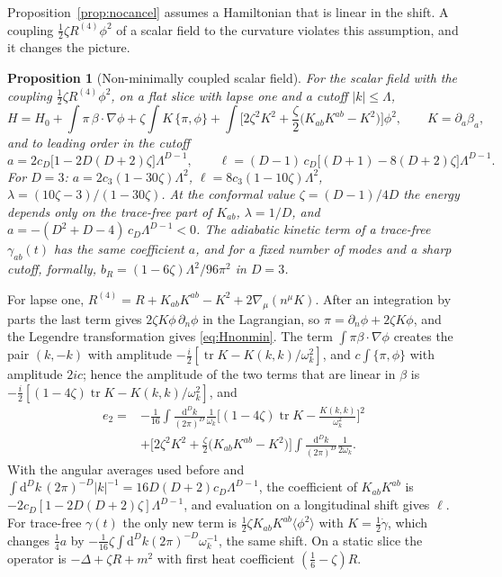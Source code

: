 \documentclass[11pt,a4paper]{article}
\makeatletter
\theoremstyle{stmt}
\newtheorem{proposition}[theorem]{Proposition}
\theoremstyle{defn}
\theoremstyle{rmk}
\renewenvironment{proof}[1][\proofname]{\par\pushQED{\qed}\normalfont\topsep6\p@\@plus6\p@\relax
  \trivlist\item[\hskip\labelsep{\sffamily\itshape\small #1.}]\ignorespaces}{\popQED\endtrivlist\@endpefalse}
\numberwithin{equation}{section}
\newcommand{\dd}{\mathrm{d}}
\makeatother
\begin{document}
Proposition~\ref{prop:nocancel} assumes a Hamiltonian that is linear in the shift. A coupling $\tfrac12\zeta R^{(4)}\phi^2$ of a scalar field to the curvature violates this assumption, and it changes the picture.

\begin{proposition}[Non-minimally coupled scalar field]\label{prop:nonmin}
For the scalar field with the coupling $\tfrac12\zeta R^{(4)}\phi^2$, on a flat slice with lapse one and a cutoff $|k|\le\Lambda$,
\begin{equation}\label{eq:Hnonmin}
H=H_0+\int\pi\,\beta\!\cdot\!\nabla\phi+\zeta\int K\,\{\pi,\phi\}+\int\Big[2\zeta^2K^2+\frac\zeta2\big(K_{ab}K^{ab}-K^2\big)\Big]\phi^2,\qquad K=\partial_a\beta_a ,
\end{equation}
and to leading order in the cutoff
\begin{equation}\label{eq:alnonmin}
a=2c_D\big[1-2D(D+2)\zeta\big]\Lambda^{D-1},\qquad\ell=(D-1)\,c_D\big[(D+1)-8(D+2)\zeta\big]\Lambda^{D-1}.
\end{equation}
For $D=3$: $a=2c_3(1-30\zeta)\Lambda^2$, $\ell=8c_3(1-10\zeta)\Lambda^2$, $\lambda=(10\zeta-3)/(1-30\zeta)$. At the conformal value $\zeta=(D-1)/4D$ the energy depends only on the trace-free part of $K_{ab}$, $\lambda=1/D$, and $a=-(D^2+D-4)\,c_D\Lambda^{D-1}<0$. The adiabatic kinetic term of a trace-free $\gamma_{ab}(t)$ has the same coefficient $a$, and for a fixed number of modes and a sharp cutoff, formally, $b_R=(1-6\zeta)\Lambda^2/96\pi^2$ in $D=3$.
\end{proposition}

\begin{proof}
For lapse one, $R^{(4)}=R+K_{ab}K^{ab}-K^2+2\nabla_\mu(n^\mu K)$. After an integration by parts the last term gives $2\zeta K\phi\,\partial_n\phi$ in the Lagrangian, so $\pi=\partial_n\phi+2\zeta K\phi$, and the Legendre transformation gives \eqref{eq:Hnonmin}. The term $\int\pi\beta\cdot\nabla\phi$ creates the pair $(k,-k)$ with amplitude $-\tfrac i2[\operatorname{tr}K-K(k,k)/\omega_k^2]$, and $c\int\{\pi,\phi\}$ with amplitude $2ic$; hence the amplitude of the two terms that are linear in $\beta$ is $-\tfrac i2[(1-4\zeta)\operatorname{tr}K-K(k,k)/\omega_k^2]$, and
\begin{align*}
e_2={}&-\frac1{16}\int\frac{\dd^Dk}{(2\pi)^D}\frac1{\omega_k}\Big[(1-4\zeta)\operatorname{tr}K-\frac{K(k,k)}{\omega_k^2}\Big]^2\\
&+\Big[2\zeta^2K^2+\frac\zeta2\big(K_{ab}K^{ab}-K^2\big)\Big]\int\frac{\dd^Dk}{(2\pi)^D}\frac1{2\omega_k}.
\end{align*}
With the angular averages used before and $\int\dd^Dk\,(2\pi)^{-D}|k|^{-1}=16D(D+2)c_D\Lambda^{D-1}$, the coefficient of $K_{ab}K^{ab}$ is $-2c_D[1-2D(D+2)\zeta]\Lambda^{D-1}$, and evaluation on a longitudinal shift gives $\ell$. For trace-free $\gamma(t)$ the only new term is $\tfrac12\zeta K_{ab}K^{ab}\langle\phi^2\rangle$ with $K=\tfrac12\dot\gamma$, which changes $\tfrac14a$ by $-\tfrac1{16}\zeta\int\dd^Dk(2\pi)^{-D}\omega_k^{-1}$, the same shift. On a static slice the operator is $-\Delta+\zeta R+m^2$ with first heat coefficient $(\tfrac16-\zeta)R$.
\end{proof}
\end{document}
